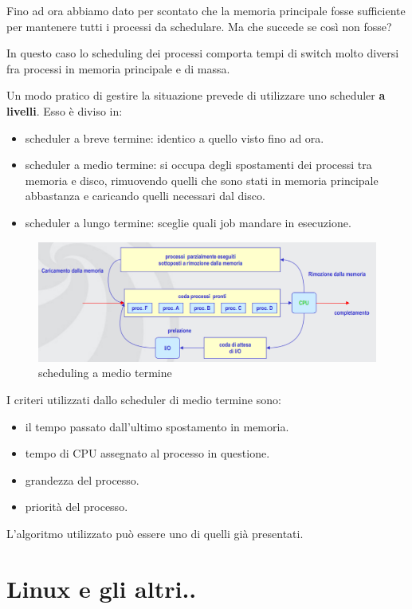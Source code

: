 Fino ad ora abbiamo dato per scontato che la memoria principale fosse sufficiente per mantenere tutti i processi da schedulare. Ma che succede se così non fosse?

In questo caso lo scheduling dei processi comporta tempi di switch molto diversi fra processi in memoria principale e di massa.

Un modo pratico di gestire la situazione prevede di utilizzare uno scheduler \textbf{a livelli}.
Esso è diviso in:
\begin{itemize}
    \item scheduler a breve termine: identico a quello visto fino ad ora.
    \item scheduler a medio termine: si occupa degli spostamenti dei processi tra memoria e disco, rimuovendo quelli che sono stati in memoria principale abbastanza e caricando quelli necessari dal disco.
    \item scheduler a lungo termine: sceglie quali job mandare in esecuzione.
\end{itemize}


\begin{figure}[H]
    \centering
    \includegraphics[width=0.9\linewidth]{assets/medio4.png}
    \caption{scheduling a medio termine}
\end{figure}

I criteri utilizzati dallo scheduler di medio termine sono:
\begin{itemize}
    \item il tempo passato dall'ultimo spostamento in memoria.
    \item tempo di CPU assegnato al processo in questione.
    \item grandezza del processo.
    \item priorità del processo.
\end{itemize}

L'algoritmo utilizzato può essere uno di quelli già presentati.

\section{Linux e gli altri..}

